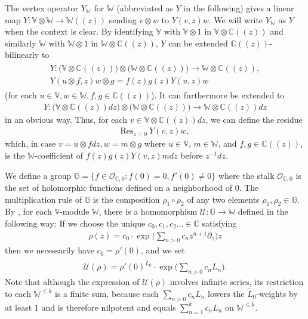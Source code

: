 \documentclass[12pt,a4paper,notitlepage]{article}
\theoremstyle{definition}
\theoremstyle{plain}
\newcommand{\mc}{\mathcal}
\newcommand{\wtd}{\widetilde}
\newcommand{\Res}{\mathrm{Res}}
\newcommand{\scr}{\mathscr}
\newcommand{\Vbb}{\mathbb V}
\newcommand{\Wbb}{\mathbb W}
\newcommand{\Gbb}{\mathbb G}
\newcommand{\Cbb}{\mathbb C}
\numberwithin{equation}{section}
\begin{document}
The vertex operator  $Y_\Wbb$ for $\Wbb$ (abbreviated as $Y$ in the following) gives a linear map $Y:\Vbb\otimes\Wbb\rightarrow \Wbb((z))$ sending $v\otimes w$ to $Y(v,z)w$. We will write $Y_\Wbb$ as $Y$ when the context is clear. By identifying $\Vbb$ with $\Vbb\otimes 1$ in $\Vbb\otimes\Cbb((z))$ and similarly $\Wbb$ with $\Wbb\otimes 1$ in $\Wbb\otimes\Cbb((z))$, $Y$ can be extended $\Cbb((z))$-bilinearly to \index{Y@$Y_\Wbb=Y$}
\begin{gather}
\begin{array}{c}
Y:\Big(\Vbb\otimes\Cbb((z))\Big)\otimes\Big(\Wbb\otimes \Cbb((z))\Big)\rightarrow \Wbb\otimes\Cbb((z)),\\[1.5ex]
Y(u\otimes f,z)w\otimes g=f(z)g(z)Y(u,z)w
\end{array}\label{eq3}
\end{gather}
(for each $u\in\Vbb,w\in\Wbb,f,g\in\Cbb((z))$). It can furthermore be extended to 
\begin{align}
Y:	\Big(\Vbb\otimes\Cbb((z))dz\Big)\otimes \Big(\Wbb\otimes\Cbb((z))\Big)\rightarrow \Wbb\otimes \Cbb((z))dz \label{eq4}
\end{align}
in an obvious way. Thus, for each $v\in\Vbb\otimes\Cbb((z))dz$, we can define the residue \index{Res@$\Res$}
\begin{align}
\Res_{z=0}~Y(v,z)w,\label{eq5}
\end{align}
which, in case $v=u\otimes fdz,w=m\otimes g$ where $u\in\Vbb$, $m\in\Wbb$,  and $f,g\in\Cbb((z))$, is the $\Wbb$-coefficient of  $f(z)g(z)Y(v,z)mdz$ before $z^{-1}dz$.

We define a group $\Gbb=\{f\in\scr O_{\Cbb,0}:f(0)=0,f'(0)\neq 0\}$ \index{G@$\Gbb$} where the stalk $\scr O_{\Cbb,0}$ is the set of holomorphic functions defined on a neighborhood of $0$. The multiplication  rule of $\Gbb$ is the composition $\rho_1\circ\rho_2$ of any two elements $\rho_1,\rho_2\in\Gbb$. By \cite{Hua97}, for each $\Vbb$-module $\Wbb$, there is a homomorphism $\mc U:\Gbb\rightarrow\Wbb$ defined in the following way: If we choose the unique $c_0,c_1,c_2\dots\in\Cbb$ satisfying
\begin{align*}
\rho(z)=c_0\cdot\exp\Big(\sum_{n>0}c_nz^{n+1}\partial_z\Big)z
\end{align*}
then we necessarily have $c_0=\rho'(0)$, and we set \index{U@$\mc U(\rho)$}
\begin{align*}
\mc U(\rho)=\rho'(0)^{\wtd L_0}\cdot\exp\Big(\sum_{n>0}c_nL_n\Big).
\end{align*}
Note that although the expression of $\mc U(\rho)$ involves infinite series, its restriction to each $\Wbb^{\leq k}$ is a finite sum, because each $\sum_{n>0} c_nL_n$ lowers the $\wtd L_0$-weights by at least $1$ and is therefore nilpotent and equals $\sum_{n=1}^k c_nL_n$ on $\Wbb^{\leq k}$.
\end{document}
